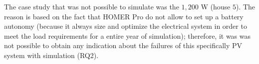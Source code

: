 The case study that was not possible to simulate was the $1,200$ W (house $5$). The reason is based on the fact that HOMER Pro do not allow to set up a battery autonomy (because it always size and optimize the electrical system in order to meet the load requirements for a entire year of simulation); therefore, it was was not possible to obtain any indication about the failures of this specifically PV system with simulation (RQ2).  

%
%
%

